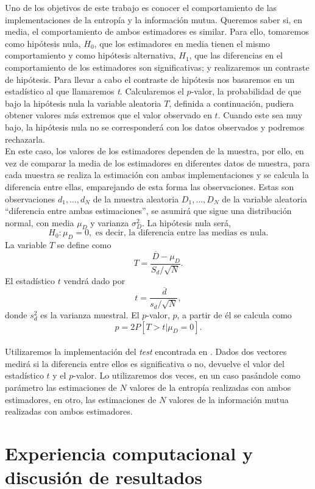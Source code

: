 \documentclass[12pt,a4paper]{report} %
\newcommand{\olsi}[1]{\,\overline{\!{#1}}} %
\theoremstyle{definition}
\begin{document}
Uno de los objetivos de este trabajo es conocer el comportamiento de las implementaciones de la entropía y la información mutua. Queremos saber si, en media, el comportamiento de ambos estimadores es similar. Para ello, tomaremos como hipótesis nula, $H_0$, que los estimadores en media tienen el mismo comportamiento y como hipótesis alternativa, $H_1$, que las diferencias en el comportamiento de los estimadores son significativas; y realizaremos un contraste de hipótesis. Para llevar a cabo el contraste de hipótesis nos basaremos en un estadístico al que llamaremos \textit{t}. Calcularemos el $p$-valor, la probabilidad de que bajo la hipótesis nula la variable aleatoria $T$, definida a continuación, pudiera obtener valores más extremos que el valor observado en $t$. Cuando este sea muy bajo, la hipótesis nula no se corresponderá con los datos observados y podremos rechazarla.\\

En este caso, los valores de los estimadores dependen de la muestra, por ello, en vez de comparar la media de los estimadores en diferentes datos de muestra, para cada muestra se realiza la estimación con ambas implementaciones y se calcula la diferencia entre ellas, emparejando de esta forma las observaciones. Estas son observaciones $d_1,\dots,d_N$ de la muestra aleatoria $D_1,\dots, D_N$ de la variable aleatoria ``diferencia entre ambas estimaciones'', se asumirá que sigue una distribución normal, con media $\mu_D$ y varianza $\sigma^2_D$. La hipótesis nula será,\[
H_0: \mu_D = 0,\text{ es decir, la diferencia entre las medias es nula}.
\]
La variable $T$ se define como\[
T = \frac{\olsi{D} - \mu_D}{S_d/\sqrt{N}}.
\]
El estadístico $t$ vendrá dado por\[
t = \frac{\olsi{d}}{s_d/\sqrt{N}},
\]
donde $s^2_d$ es la varianza muestral. El $p$-valor, $p$, a partir de él se calcula como \[
p = 2 P \left [ T > t | \mu_D = 0 \right ]. 
\]\\[-10pt]

Utilizaremos la implementación del \textit{test} encontrada en \cite{ttest}. Dados dos vectores medirá si la diferencia entre ellos es significativa o no, devuelve el valor del estadístico $t$ y el $p$-valor. Lo utilizaremos dos veces, en un caso pasándole como parámetro las estimaciones de $N$ valores de la entropía realizadas con ambos estimadores, en otro, las estimaciones de $N$ valores de la información  mutua realizadas con ambos estimadores.\\

\chapter{Experiencia computacional y discusión de resultados}
\end{document}
